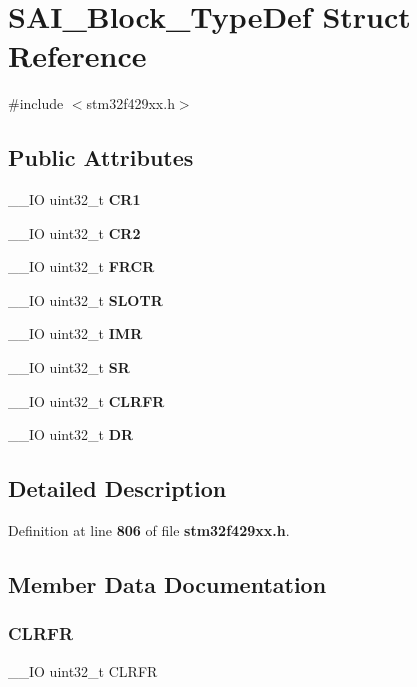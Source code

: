 \section{S\+A\+I\+\_\+\+Block\+\_\+\+Type\+Def Struct Reference}
\label{structSAI__Block__TypeDef}


{\ttfamily \#include $<$stm32f429xx.\+h$>$}

\subsection*{Public Attributes}
\begin{DoxyCompactItemize}
\item 
\+\_\+\+\_\+\+IO uint32\+\_\+t \textbf{ C\+R1}
\item 
\+\_\+\+\_\+\+IO uint32\+\_\+t \textbf{ C\+R2}
\item 
\+\_\+\+\_\+\+IO uint32\+\_\+t \textbf{ F\+R\+CR}
\item 
\+\_\+\+\_\+\+IO uint32\+\_\+t \textbf{ S\+L\+O\+TR}
\item 
\+\_\+\+\_\+\+IO uint32\+\_\+t \textbf{ I\+MR}
\item 
\+\_\+\+\_\+\+IO uint32\+\_\+t \textbf{ SR}
\item 
\+\_\+\+\_\+\+IO uint32\+\_\+t \textbf{ C\+L\+R\+FR}
\item 
\+\_\+\+\_\+\+IO uint32\+\_\+t \textbf{ DR}
\end{DoxyCompactItemize}


\subsection{Detailed Description}


Definition at line \textbf{ 806} of file \textbf{ stm32f429xx.\+h}.



\subsection{Member Data Documentation}
\mbox{\label{structSAI__Block__TypeDef_aa46ece753867049c7643819478b8330b}} 
\subsubsection{C\+L\+R\+FR}
{\footnotesize\ttfamily \+\_\+\+\_\+\+IO uint32\+\_\+t C\+L\+R\+FR}

